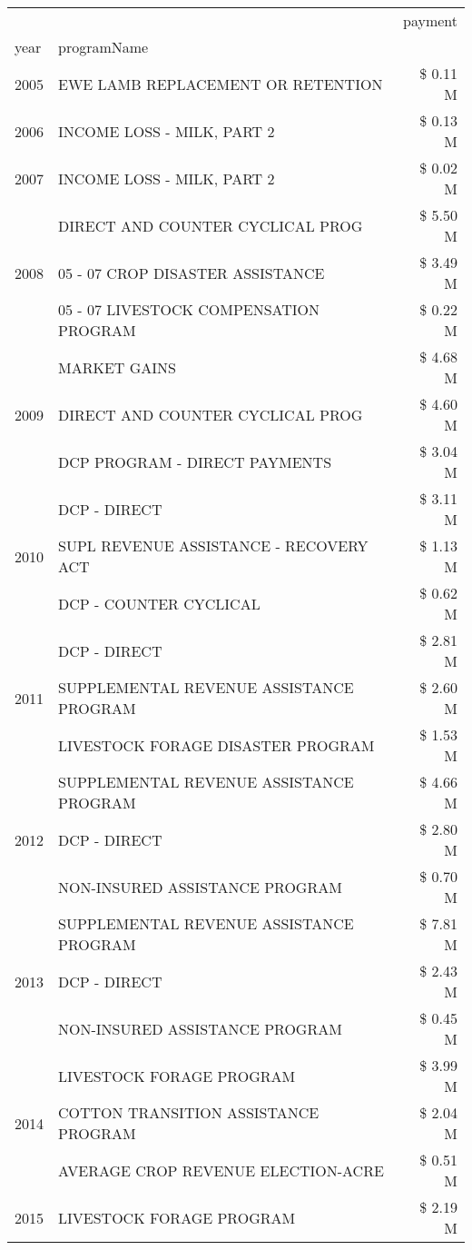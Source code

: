 \begin{tabular}{llr}
\toprule
 &  & payment \\
year & programName &  \\
\midrule
2005 & EWE LAMB REPLACEMENT OR RETENTION & \$ 0.11 M \\
\cline{1-3}
2006 & INCOME LOSS - MILK, PART 2 & \$ 0.13 M \\
\cline{1-3}
2007 & INCOME LOSS - MILK, PART 2 & \$ 0.02 M \\
\cline{1-3}
\multirow[t]{3}{*}{2008} & DIRECT AND COUNTER CYCLICAL PROG & \$ 5.50 M \\
 & 05 - 07 CROP DISASTER ASSISTANCE & \$ 3.49 M \\
 & 05 - 07 LIVESTOCK COMPENSATION PROGRAM & \$ 0.22 M \\
\cline{1-3}
\multirow[t]{3}{*}{2009} & MARKET GAINS & \$ 4.68 M \\
 & DIRECT AND COUNTER CYCLICAL PROG & \$ 4.60 M \\
 & DCP PROGRAM - DIRECT PAYMENTS & \$ 3.04 M \\
\cline{1-3}
\multirow[t]{3}{*}{2010} & DCP - DIRECT & \$ 3.11 M \\
 & SUPL REVENUE ASSISTANCE - RECOVERY ACT & \$ 1.13 M \\
 & DCP - COUNTER CYCLICAL & \$ 0.62 M \\
\cline{1-3}
\multirow[t]{3}{*}{2011} & DCP - DIRECT & \$ 2.81 M \\
 & SUPPLEMENTAL REVENUE ASSISTANCE PROGRAM & \$ 2.60 M \\
 & LIVESTOCK FORAGE DISASTER PROGRAM & \$ 1.53 M \\
\cline{1-3}
\multirow[t]{3}{*}{2012} & SUPPLEMENTAL REVENUE ASSISTANCE PROGRAM & \$ 4.66 M \\
 & DCP - DIRECT & \$ 2.80 M \\
 & NON-INSURED ASSISTANCE PROGRAM & \$ 0.70 M \\
\cline{1-3}
\multirow[t]{3}{*}{2013} & SUPPLEMENTAL REVENUE ASSISTANCE PROGRAM & \$ 7.81 M \\
 & DCP - DIRECT & \$ 2.43 M \\
 & NON-INSURED ASSISTANCE PROGRAM & \$ 0.45 M \\
\cline{1-3}
\multirow[t]{3}{*}{2014} & LIVESTOCK FORAGE PROGRAM & \$ 3.99 M \\
 & COTTON TRANSITION ASSISTANCE PROGRAM & \$ 2.04 M \\
 & AVERAGE CROP REVENUE ELECTION-ACRE & \$ 0.51 M \\
\cline{1-3}
\multirow[t]{3}{*}{2015} & LIVESTOCK FORAGE PROGRAM & \$ 2.19 M \\

\end{tabular}
